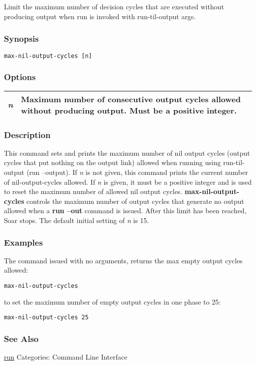 \subsection{}
\label{max-nil-output-cycles}
Limit the maximum number of decision cycles that are executed without producing output when run is invoked with run-til-output args. 
\subsubsection*{Synopsis}
\begin{verbatim}
max-nil-output-cycles [n]
\end{verbatim}
\subsubsection*{Options}
\begin{tabular}{|l|l|}
\hline
\emph{n}
 & Maximum number of consecutive output cycles allowed without producing output. Must be a positive integer.  \\
\hline
\end{tabular}
\subsubsection*{Description}
 This command sets and prints the maximum number of nil output cycles (output cycles that put nothing on the output link) allowed when running using run-til-output (run --output). If \emph{n}
 is not given, this command prints the current number of nil-output-cycles allowed. If \emph{n}
 is given, it must be a positive integer and is used to reset the maximum number of allowed nil output cycles. 
 \textbf{max-nil-output-cycles}
 controls the maximum number of output cycles that generate no output allowed when a \textbf{run --out}
 command is issued. After this limit has been reached, Soar stops. The default initial setting of \emph{n}
 is 15. 
\subsubsection*{Examples}
 The command issued with no arguments, returns the max empty output cycles allowed: \begin{verbatim}
max-nil-output-cycles 
\end{verbatim}
 to set the maximum number of empty output cycles in one phase to 25: \begin{verbatim}
max-nil-output-cycles 25 
\end{verbatim}
\subsubsection*{See Also}
\hyperref[run]{run}  Categories: Command Line Interface
